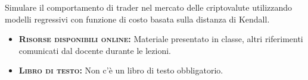 \documentclass[11pt, a4paper]{article}
\begin{document}
\noindent
Simulare il comportamento di trader nel mercato delle criptovalute utilizzando modelli regressivi con funzione di costo basata sulla distanza di Kendall.


\begin{itemize}[itemsep=4pt,parsep=0pt,topsep=1pt,partopsep=1pt]
	\item[\color{darkblue}\faNewspaper] \textbf{\textsc{Risorse disponibili online:}}
	Materiale presentato in classe, altri riferimenti comunicati dal docente durante le lezioni.  
		
	\item[\color{darkblue}\faBook] \textbf{\textsc{Libro di testo:}} Non c'\`{e} un libro di testo obbligatorio. %
\end{itemize}
\end{document}
